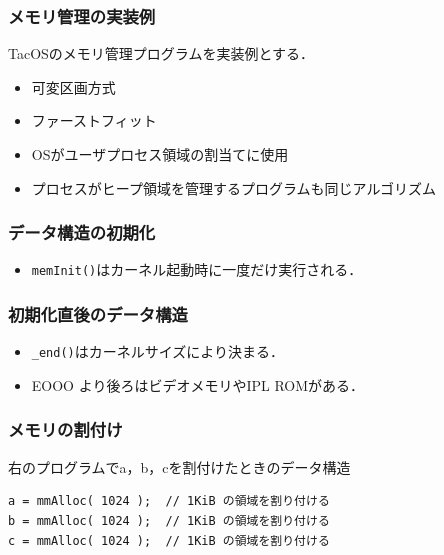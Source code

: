 \documentclass[unicode,handout]{beamer}                   %
\begin{document}
\begin{frame}
  \frametitle{メモリ管理の実装例}
  TacOSのメモリ管理プログラムを実装例とする．
  \begin{itemize}
  \item 可変区画方式
  \item ファーストフィット
  \item OSがユーザプロセス領域の割当てに使用
  \item プロセスがヒープ領域を管理するプログラムも同じアルゴリズム
  \end{itemize}
\end{frame}

\begin{frame}
  \frametitle{データ構造の初期化}
  \begin{itemize}
  \item {\tt memInit()}はカーネル起動時に一度だけ実行される．
  \end{itemize}
\end{frame}

\begin{frame}
  \frametitle{初期化直後のデータ構造}
  \begin{itemize}
  \item {\tt \_end()}はカーネルサイズにより決まる．
  \item EOOO より後ろはビデオメモリやIPL ROMがある．
  \end{itemize}
\end{frame}

\begin{frame}[fragile]
  \frametitle{メモリの割付け}
  右のプログラムでa，b，cを割付けたときのデータ構造
  \begin{center}
    \begin{minipage}{0.39\columnwidth}
    \end{minipage}
    \begin{minipage}{0.59\columnwidth}
      \begin{lstlisting}
a = mmAlloc( 1024 );  // 1KiB の領域を割り付ける
b = mmAlloc( 1024 );  // 1KiB の領域を割り付ける
c = mmAlloc( 1024 );  // 1KiB の領域を割り付ける
      \end{lstlisting}
    \end{minipage}
  \end{center}
  \vfill
\end{frame}
\end{document}
